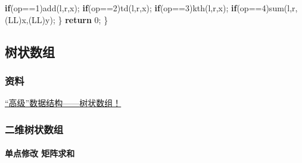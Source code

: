 \documentclass[
]{article}
\newenvironment{Shaded}{}{}
\newcommand{\ControlFlowTok}[1]{\textcolor[rgb]{0.00,0.44,0.13}{\textbf{#1}}}
\newcommand{\DecValTok}[1]{\textcolor[rgb]{0.25,0.63,0.44}{#1}}
\newcommand{\NormalTok}[1]{#1}
\begin{document}
\begin{Shaded}
\begin{Highlighting}[]
        \ControlFlowTok{if}\NormalTok{(op==}\DecValTok{1}\NormalTok{)add(l,r,x);}
        \ControlFlowTok{if}\NormalTok{(op==}\DecValTok{2}\NormalTok{)td(l,r,x);}
        \ControlFlowTok{if}\NormalTok{(op==}\DecValTok{3}\NormalTok{)kth(l,r,x);}
        \ControlFlowTok{if}\NormalTok{(op==}\DecValTok{4}\NormalTok{)sum(l,r,(LL)x,(LL)y);}
\NormalTok{    \}}
    \ControlFlowTok{return} \DecValTok{0}\NormalTok{;}
\NormalTok{\}}
\end{Highlighting}
\end{Shaded}

\hypertarget{ux6811ux72b6ux6570ux7ec4}{%
\subsection{树状数组}\label{ux6811ux72b6ux6570ux7ec4}}

\hypertarget{ux8d44ux6599-1}{%
\subsubsection{资料}\label{ux8d44ux6599-1}}

\href{https://www.cnblogs.com/RabbitHu/p/BIT.html}{``高级''数据结构------树状数组！}

\hypertarget{ux4e8cux7ef4ux6811ux72b6ux6570ux7ec4}{%
\subsubsection{二维树状数组}\label{ux4e8cux7ef4ux6811ux72b6ux6570ux7ec4}}

\hypertarget{ux5355ux70b9ux4feeux6539-ux77e9ux9635ux6c42ux548c}{%
\paragraph{单点修改
矩阵求和}\label{ux5355ux70b9ux4feeux6539-ux77e9ux9635ux6c42ux548c}}
\end{document}
